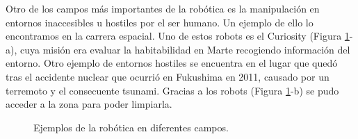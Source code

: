 Otro de los campos más importantes de la robótica es la manipulación en entornos inaccesibles u hostiles por el ser humano. Un ejemplo de ello lo encontramos en la carrera espacial. Uno de estos robots es el Curiosity (Figura \ref{fig:robots}-a), cuya misión era evaluar la habitabilidad en Marte recogiendo información del entorno. Otro ejemplo de entornos hostiles se encuentra en el lugar que quedó tras el accidente nuclear que ocurrió en Fukushima en 2011, causado por un terremoto y el consecuente tsunami. Gracias a los robots (Figura \ref{fig:robots}-b) se pudo acceder a la zona para poder limpiarla.\\
\begin{figure}[h!]
  \begin{center}
    \hspace{2mm}
  \end{center}
\caption{Ejemplos de la robótica en diferentes campos.} \label{fig:robots}
\end{figure}

